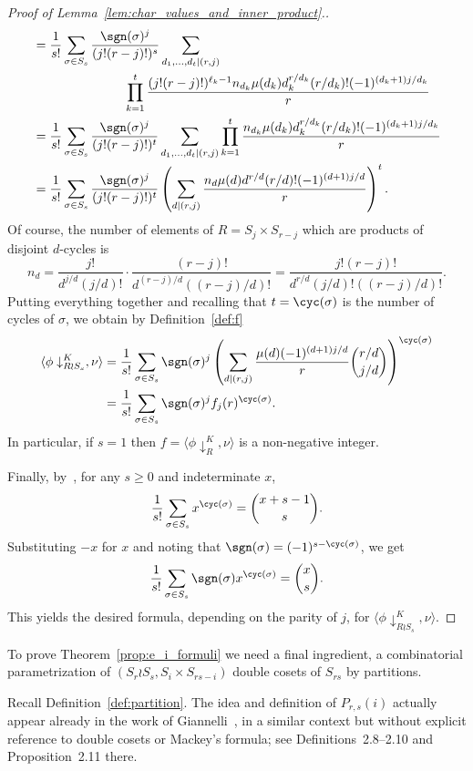 \begin{proof}[Proof of  Lemma~\ref{lem:char_values_and_inner_product}.]
\begin{align*}
        &= \frac{1}{s!} \sum_{\sigma\in S_s} 
        \frac{\sgn(\sigma)^j}{(j!(r-j)!)^s} 
        \sum_{d_1,\ldots, d_t | (r,j)}\\
        &\, \qquad\qquad\qquad\quad
        \prod_{k=1}^{t} 
        \frac{(j!(r-j)!)^{\ell_k-1} n_{d_k} \mu(d_k) d_k^{r/d_k} (r/d_k)! (-1)^{(d_k+1)j/d_k}}{r} \\
        &= \frac{1}{s!} \sum_{\sigma\in S_s} 
        \frac{\sgn(\sigma)^j}{(j!(r-j)!)^t} 
        \sum_{d_1,\ldots, d_t | (r,j)}
        \prod_{k=1}^{t} 
        \frac{n_{d_k} \mu(d_k) d_k^{r/d_k} (r/d_k)! (-1)^{(d_k+1)j/d_k}}{r} \\
        &= \frac{1}{s!} \sum_{\sigma \in S_s} 
        \frac{\sgn(\sigma)^j}{(j!(r-j)!)^t} 
        \left( \sum_{d|(r,j)} \frac{n_d \mu(d)d^{r/d}(r/d)!  (-1)^{(d+1)j/d}}{r} \right)^t.
    \end{align*}
    Of course, the number of elements of $R = S_j \times S_{r-j}$ which are products of disjoint $d$-cycles is
    \[
        n_d
        = \frac{j!}{d^{j/d} (j/d)!} \cdot \frac{(r-j)!}{d^{(r-j)/d} ((r-j)/d)!}
        = \frac{j!(r-j)!}{d^{r/d}(j/d)!((r-j)/d)!}.
    \]
    Putting everything together
    and recalling that $t = \cyc(\sigma)$ is the number of cycles of $\sigma$,
    we obtain by Definition~\ref{def:f}
    \begin{align*} 
        \langle \phi\downarrow_{R \wr S_{s}}^K,\nu \rangle
        &= \frac{1}{s!} \sum_{\sigma \in S_s} \sgn(\sigma)^j 
        \left( \sum_{d|(r,j)} \frac{\mu(d)(-1)^{(d+1)j/d}}{r} \binom{r/d}{j/d} \right)^{\cyc(\sigma)} \\
        &= \frac{1}{s!} \sum_{\sigma \in S_s} \sgn(\sigma)^j f_j(r)^{\cyc(\sigma)}.
    \end{align*}
    In particular, if $s=1$ then $f = \langle \phi\downarrow_R^K,\nu \rangle$
    is a non-negative integer.
		
    Finally, by~\cite[Proposition 1.3.4]{EC1}, for any $s \ge 0$ and indeterminate $x$, 
    \[
        \frac{1}{s!} \sum_{\sigma \in S_s} x^{\cyc(\sigma)}
        = \binom{x+s-1}{s}.
    \]
    Substituting $-x$ for $x$ and noting that 
    $\sgn(\sigma) = (-1)^{s-\cyc(\sigma)}$, we get
    \[
        \frac{1}{s!} \sum_{\sigma \in S_s} \sgn(\sigma) x^{\cyc(\sigma)} 
        = \binom{x}{s}.
    \]
    This yields the desired formula,
    depending on the parity of $j$,
    for $\langle \phi\downarrow_{R \wr S_{s}}^K,\nu \rangle$.
\end{proof}

To prove Theorem~\ref{prop:e_i_formuli} we need a final ingredient, a combinatorial parametrization of 
$(S_r\wr S_s,S_i\times S_{rs-i})$ double cosets of $S_{rs}$  by partitions.

Recall Definition~\ref{def:partition}. 
The idea and definition of $P_{r,s}(i)$ actually appear
already in the work of Giannelli~\cite{Giannelli}, 
in a similar context but without explicit reference to double cosets or Mackey's formula; 
see Definitions~2.8--2.10 and Proposition~2.11 there.

